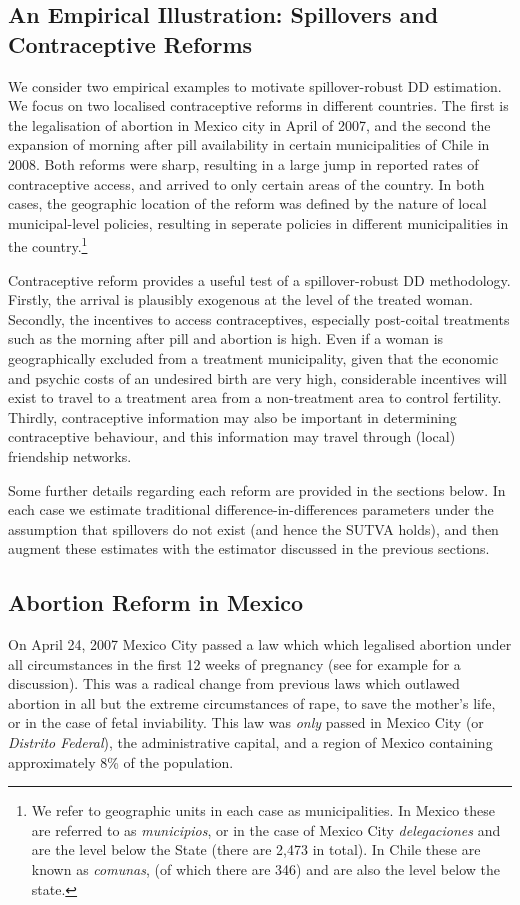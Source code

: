 \documentclass{article}
\begin{document}
\begin{spacing}{1.3}
\section{An Empirical Illustration: Spillovers and Contraceptive Reforms}
We consider two empirical examples to motivate spillover-robust DD estimation.
We focus on two localised contraceptive reforms in different countries. The first
is the legalisation of abortion in Mexico city in April of 2007, and the second
the expansion of morning after pill availability in certain municipalities of 
Chile in 2008.  Both reforms were sharp, resulting in a large jump in reported
rates of contraceptive access, and arrived to only certain areas of the country.
In both cases, the geographic location of the reform was defined by the nature
of local municipal-level policies, resulting in seperate policies in different
municipalities in the country.\footnote{We refer to geographic units in each case
as municipalities.  In Mexico these are referred to as \emph{municipios}, or in 
the case of Mexico City \emph{delegaciones} and are the level below the State 
(there are 2,473 in total).  In Chile these are known as \emph{comunas}, (of 
which there are 346) and are also the level below the state.}

Contraceptive reform provides a useful test of a spillover-robust DD methodology.
Firstly, the arrival is plausibly exogenous at the level of the treated woman.
Secondly, the incentives to access contraceptives, especially post-coital 
treatments such as the morning after pill and abortion is high.  Even if a woman
is geographically excluded from a treatment municipality, given that the economic
and psychic costs of an undesired birth are very high, considerable incentives
will exist to travel to a treatment area from a non-treatment area to control
fertility.  Thirdly, contraceptive information may also be important in
determining contraceptive behaviour, and this information may travel through
(local) friendship networks.

Some further details regarding each reform are provided in the sections below.
In each case we estimate traditional difference-in-differences parameters under
the assumption that spillovers do not exist (and hence the SUTVA holds), and
then augment these estimates with the estimator discussed in the previous
sections.

\subsection{Abortion Reform in Mexico}
On April 24, 2007 Mexico City passed a law which which legalised abortion 
under all circumstances in the first 12 weeks of pregnancy (see for example
\citet{Fraser2014} for a discussion).  This was a radical change from previous 
laws which outlawed abortion in all but the extreme circumstances of rape, 
to save the mother's life, or in the case of fetal inviability.  This law was 
\emph{only} passed in Mexico City (or \emph{Distrito Federal}), the 
administrative capital, and a region of Mexico containing approximately 8\% 
of the population.


\end{spacing}
\end{document}
